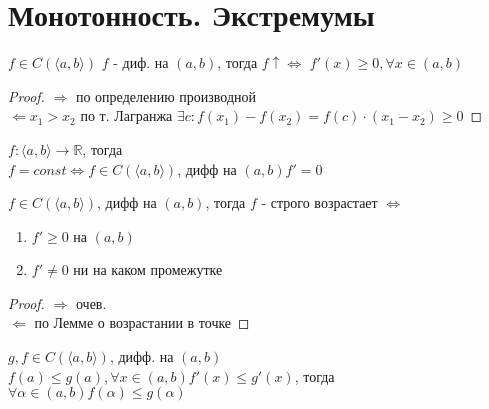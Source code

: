 \documentclass[12pt]{article}
\begin{document}
\section{Монотонность. Экстремумы}
\begin{theorem}
$f \in C(\langle a, b \rangle)$ $f$ - диф. на $(a, b)$, тогда $f \uparrow \Leftrightarrow$ $f'(x) \ge 0, \forall x \in (a, b)$
\end{theorem}
\begin{proof}
  $\Rightarrow$ по определению производной \\
  $\Leftarrow x_1 > x_2$ по т. Лагранжа $\exists c: f(x_1) - f(x_2) = f(c)\cdot(x_1 - x_2) \ge 0$ 
\end{proof}
\begin{corollary}
  $f: \langle a, b \rangle \rightarrow \mathbb{R}$, тогда \\
  $f = const \Leftrightarrow f \in C(\langle a, b \rangle )$, дифф на $(a, b) f' = 0$
\end{corollary}
\begin{corollary}
  $f \in C(\langle a, b \rangle)$, дифф на $(a, b)$, тогда $f$ - строго возрастает $\Leftrightarrow$
  \begin{enumerate}
  \item $f' \ge 0$ на $(a, b)$
  \item $f' \not = 0$ ни на каком промежутке
  \end{enumerate}
\end{corollary}
\begin{proof}
  $\Rightarrow$ очев. \\
  $\Leftarrow$ по Лемме о возрастании в точке
\end{proof}
\begin{corollary}
  $g, f \in C(\langle a, b \rangle)$, дифф. на $(a, b)$ \\
  $f(a) \le g(a), \forall x \in (a, b) f'(x) \le g'(x)$, тогда $\forall \alpha \in (a, b) f(\alpha) \le g(\alpha)$
\end{corollary}
\end{document}

